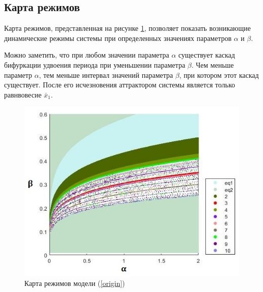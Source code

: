 \subsection{Карта режимов}

    Карта режимов, представленная на рисунке \ref{regimeMap}, позволяет показать возникающие динамические режимы системы при определенных значениях параметров \(\alpha\) и \(\beta\).

    Можно заметить, что при любом значении параметра \(\alpha\) существует каскад бифуркации удвоения периода при уменьшении параметра \(\beta\). Чем меньше параметр \(\alpha\), тем меньше интервал значений параметра \(\beta\), при котором этот каскад существует. После его исчезновения аттрактором системы является только равнвовесие \(\bar{x}_1\).

    \begin{figure}
        \centering
        \includegraphics[width=\textwidth]{deterministic/images/regime_map.jpg}

        \captionsetup{justification=centering}
        \caption{Карта режимов модели (\ref{origin})}
        \label{regimeMap}
    \end{figure}
